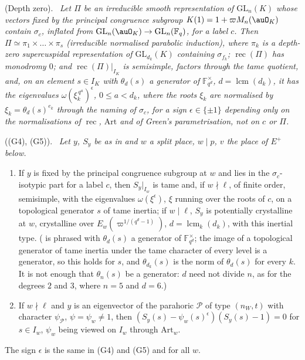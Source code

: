 \documentclass[10pt]{amsart}
\theoremstyle{definition}
\theoremstyle{remark}
\providecommand{\auF}{\mathbb F}
\providecommand{\auGL}{\mathrm{GL}}
\providecommand{\pgarec}{\operatorname{rec}}
\newenvironment{quotedthm}[2]{\par\medskip\noindent\begingroup
  \textbf{#1}#2.\ \itshape\ignorespaces}{\endgroup\par\medskip}
\begin{document}
\begin{quotedthm}{\cite[Lemma~6.4]{P55}}{ (Depth zero)}
Let $\Pi$ be an irreducible smooth representation of $\auGL_n(K)$ whose vectors fixed by the
principal congruence subgroup $K(1)=1+\varpi M_n(\auO_K)$ contain $\sigma_c$, inflated from
$\auGL_n(\auO_K)\to\auGL_n(\auF_q)$, for a label $c$. Then $\Pi\simeq\pi_1\times\dots\times\pi_s$
(irreducible normalised parabolic induction), where $\pi_k$ is a depth-zero supercuspidal
representation of $\auGL_{d_k}(K)$ containing $\sigma_{f_k}$; $\pgarec(\Pi)$ has monodromy $0$;
and $\pgarec(\Pi)|_{I_K}$ is semisimple, factors through the tame quotient, and, on an element
$s\in I_K$ with $\theta_d(s)$ a generator of $\auF_{q^d}^\times$, $d=\operatorname{lcm}(d_k)$, it
has the eigenvalues $\omega(\xi_k^{\,q^a})^{\epsilon}$, $0\le a<d_k$, where the roots $\xi_k$ are
normalised by $\xi_k=\theta_{d}(s)^{e_k}$ through the naming of $\sigma_c$, for a sign $\epsilon\in\{\pm1\}$ depending only on the normalisations of
$\pgarec$, $\mathrm{Art}$ and of Green's parametrisation, not on $c$ or $\Pi$.
\end{quotedthm}

\begin{quotedthm}{\cite[Proposition~6.6]{P55}}{ ((G4), (G5))}
Let $y$, $S_y$ be as in {\cite[Proposition~6.2]{P55}} and $w$ a split
place, $w\mid p$, $v$ the place of $E^+$ below.
\begin{enumerate}
\item[(G4)] If $y$ is fixed by the principal congruence subgroup at $w$ and lies in the
$\sigma_c$-isotypic part for a label $c$, then $S_y|_{I_w}$ is tame and, if $w\nmid\ell$, of finite
order, semisimple, with the eigenvalues $\omega(\xi^{\epsilon})$, $\xi$ running over the roots of
$c$, on a topological generator $s$ of tame inertia; if $w\mid\ell$, $S_y$ is
potentially crystalline at $w$, crystalline over $E_w(\varpi^{1/(q^d-1)})$, $d=\operatorname{lcm}_k(d_k)$,
with this inertial type. ({\cite[Lemma~6.4]{P55}} is phrased with $\theta_d(s)$ a generator of $\auF_{q^d}^\times$; the image of a topological generator of tame inertia
under the tame character of every level is a generator, so this holds for $s$, and $\theta_{d_k}(s)$ is the norm of $\theta_d(s)$ for every $k$. It is not enough that $\theta_n(s)$ be a generator:
$d$ need not divide $n$, as for the degrees $2$ and $3$, where $n=5$ and $d=6$.)
\item[(G5)] If $w\nmid\ell$ and $y$ is an eigenvector of the parahoric $\mathcal P$ of type
$(n_W,t)$ with character $\psi_{\mathcal P}$, $\psi=\psi_w\ne1$, then $(S_y(s)-\psi_w(s)^{
\epsilon})(S_y(s)-1)=0$ for $s\in I_w$, $\psi_w$ being viewed on $I_w$ through $\mathrm{Art}_w$.
\end{enumerate}
The sign $\epsilon$ is the same in (G4) and (G5) and for all $w$.
\end{quotedthm}
\end{document}
